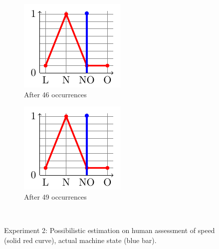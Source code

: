 \begin{figure}
\begin{subfigure}[t]{.15\linewidth}
\includegraphics[width=\linewidth]{plot_tikz/speed28CONF.pdf}
\caption{After 46 occurrences}
\label{fig:c}
\end{subfigure}
\begin{subfigure}[t]{.15\linewidth}
\includegraphics[width=\linewidth]{plot_tikz/speed28CONF.pdf}
\caption{After 49 occurrences}
\end{subfigure}
\\
\vspace{0.5cm}
\caption[Possibilistic estimation on human assessment: experiment 2]{Experiment 2: Possibilistic estimation on human assessment of speed (solid red curve), actual machine state (blue bar).}
\label{fig:SpeedC}
\end{figure}


